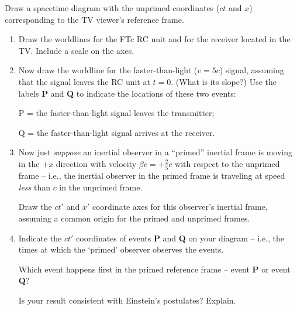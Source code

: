 \documentclass[11pt, letterpaper, openany]{book}
\newenvironment{exercise}[1][Exercise]{%
  \tcolorbox[blanker, breakable, left=1em,
    before skip=1em, after skip=1em,
    borderline west={3pt}{0pt}{PhysNavy},
    colback=PhysCream,
    before upper={\textcolor{PhysNavy}{\sffamily\bfseries #1:}\space}
  ]%
}{%
  \endtcolorbox%
}
\begin{document}
\begin{exercise}[Exercise 1]
Draw a spacetime diagram with the unprimed coordinates ($ct$ and $x$) corresponding to the TV viewer's reference frame.
\begin{enumerate}[label=(\alph*)]
    \item Draw the worldlines for the FTc RC unit and for the receiver located in the TV. Include a scale on the axes.
    \item Now draw the worldline for the faster-than-light ($v=5c$) signal, assuming that the signal leaves the RC unit at $t=0$. (What is its slope?) Use the labels \textbf{P} and \textbf{Q} to indicate the locations of these two events:
    
    P = the faster-than-light signal leaves the transmitter;
    
    Q = the faster-than-light signal arrives at the receiver.
    \item Now just \textit{suppose} an inertial observer in a ``primed'' inertial frame is moving in the $+x$ direction with velocity $\beta c = +\frac{2}{5} c$ with respect to the unprimed frame -- i.e., the inertial observer in the primed frame is traveling at speed \textit{less} than $c$ in the unprimed frame.
    
    Draw the $ct'$ and $x'$ coordinate axes for this observer's inertial frame, assuming a common origin for the primed and unprimed frames.
    \item Indicate the $ct'$ coordinates of events \textbf{P} and \textbf{Q} on your diagram -- i.e., the times at which the `primed' observer observes the events.
    
    Which event happens first in the primed reference frame -- event \textbf{P} or event \textbf{Q}?
    
    Is your result consistent with Einstein's postulates? Explain.
\end{enumerate}
\end{exercise}
\end{document}
